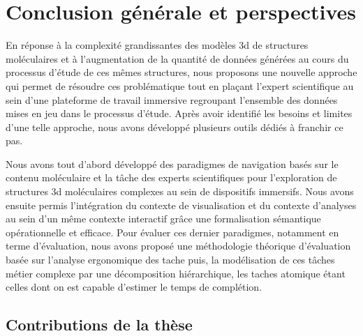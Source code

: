 


\chapter*{Conclusion générale et perspectives}
\mtcaddchapter

\mtcaddpart


En réponse à la complexité grandissantes des modèles 3d de structures moléculaires et à l'augmentation de la quantité de données générées au cours du processus d'étude de ces mêmes structures, nous proposons une nouvelle approche qui permet de résoudre ces problématique tout en plaçant l'expert scientifique au sein d'une plateforme de travail immersive regroupant l'ensemble des données mises en jeu dans le processus d'étude. Après avoir identifié les besoins et limites d'une telle approche, nous avons développé plusieurs outils dédiés à franchir ce pas. 

Nous avons tout d'abord développé des paradigmes de navigation basés sur le contenu moléculaire et la tâche des experts scientifiques pour l'exploration de structures 3d moléculaires complexes au sein de dispositifs immersifs. Nous avons ensuite permis l'intégration du contexte de visualisation et du contexte  d'analyses au sein d'un même contexte interactif grâce une formalisation sémantique opérationnelle et efficace. Pour évaluer ces dernier paradigmes, notamment en terme d'évaluation, nous avons proposé une méthodologie théorique d'évaluation basée sur l'analyse ergonomique des tache puis, la modélisation de ces tâches métier complexe par une décomposition hiérarchique, les taches atomique étant celles dont on est capable d'estimer le temps de complétion. 

\section*{Contributions de la thèse}


